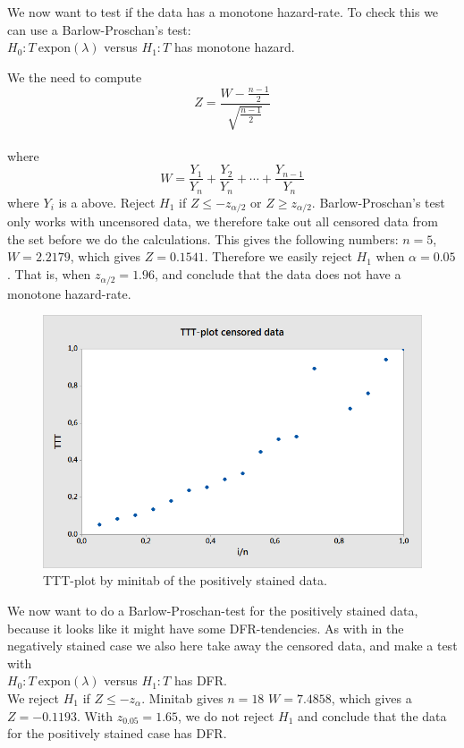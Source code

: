 \documentclass[10pt, a4paper]{article}
\begin{document}
We now want to test if the data has a monotone hazard-rate. To check this we can use a Barlow-Proschan's test:\\
$H_0 : T ~ \text{expon}(\lambda) $ versus $ H_1 : T $ has monotone hazard.

We the need to compute \\
$$ Z = \frac{W-\frac{n-1}{2}}{\sqrt{\frac{n-1}{2}}} $$ \\
where $$W = \frac{Y_1}{Y_n}+\frac{Y_2}{Y_n}+\cdots+\frac{Y_{n-1}}{Y_n}$$ where $Y_i$ is a above.
Reject $ H_1 $ if $ Z \leq -z_{\alpha/2} $ or $ Z \geq z_{\alpha/2} $. Barlow-Proschan's test only works with uncensored data, we therefore take out all censored data from the set before we do the calculations. 
This gives the following numbers:
$ n=5 $, $ W =2.2179  $, which gives $ Z = 0.1541 $. Therefore we easily reject $ H_1$ when $\alpha =0.05$. That is, when $ z_{\alpha/2} = 1.96 $, and conclude that the data does not have a monotone hazard-rate.\\

\begin{center}
\begin{figure}[h!]
\centering
\includegraphics[scale=0.75]{TTT2.png}
\caption{TTT-plot by minitab of the positively stained data.}
\end{figure}
\end{center}

We now want to do a Barlow-Proschan-test for the positively stained data, because it looks like it might have some DFR-tendencies. As with in the negatively stained case we also here take away the censored data, and make a test with\\
$H_0 : T ~ \text{expon}(\lambda) $ versus $ H_1 : T $ has DFR.\\
We reject $H_1$ if $ Z\leq -z_\alpha $. Minitab gives $ n=18 $ $ W = 7.4858 $,  which gives a $Z = -0.1193 $. With $ z_{0.05} = 1.65 $, we do not reject $H_1 $ and conclude that the data for the positively stained case has DFR.\\
\end{document}
